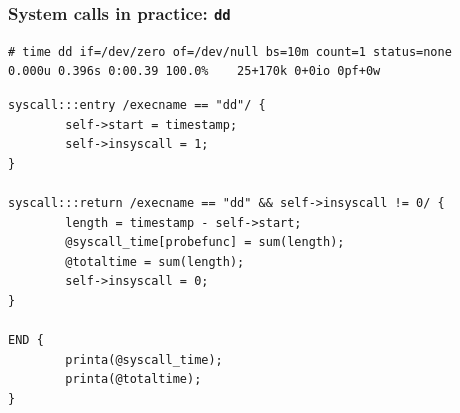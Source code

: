 %
%

\begin{frame}[fragile]
  \frametitle{System calls in practice: \texttt{dd}}

  \begin{scriptsize}
\begin{verbatim}
# time dd if=/dev/zero of=/dev/null bs=10m count=1 status=none
0.000u 0.396s 0:00.39 100.0%	25+170k 0+0io 0pf+0w
\end{verbatim}
  \end{scriptsize}

  \pause

  \begin{scriptsize}
\begin{verbatim}
syscall:::entry /execname == "dd"/ {
        self->start = timestamp;
        self->insyscall = 1;
}

syscall:::return /execname == "dd" && self->insyscall != 0/ {
        length = timestamp - self->start;
        @syscall_time[probefunc] = sum(length);
        @totaltime = sum(length);
        self->insyscall = 0;
}

END {
        printa(@syscall_time);
        printa(@totaltime);
}
\end{verbatim}
  \end{scriptsize}
\end{frame}

